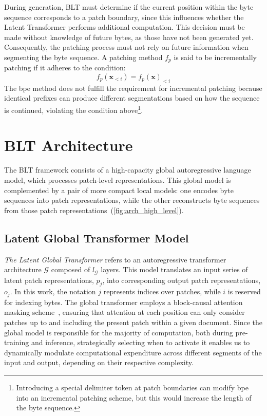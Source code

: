 During generation, {\textsc BLT} must determine if the current position within the byte sequence corresponds to a patch boundary, since this influences whether the Latent Transformer performs additional computation. This decision must be made without knowledge of future bytes, as those have not been generated yet. Consequently, the patching process must not rely on future information when segmenting the byte sequence. A patching method $f_p$ is said to be incrementally patching if it adheres to the condition:
$$f_p(\pmb{x}_{<i}) = f_p(\pmb{x})_{<i}$$
The bpe method does not fulfill the requirement for incremental patching because identical prefixes can produce different segmentations based on how the sequence is continued, violating the condition above\footnote{Introducing a special delimiter token at patch boundaries can modify bpe into an incremental patching scheme, but this would increase the length of the byte sequence.}.

\section{{\textsc BLT} Architecture}
\label{section:architecture}
The {\textsc BLT} framework consists of a high-capacity global autoregressive language model, which processes patch-level representations. This global model is complemented by a pair of more compact local models: one encodes byte sequences into patch representations, while the other reconstructs byte sequences from those patch representations~(\autoref{fig:arch_high_level}).

\subsection{Latent Global Transformer Model}

\textit{The Latent Global Transformer} refers to an autoregressive transformer architecture $\mathcal{G}$ composed of $l_{\mathcal{G}}$ layers. This model translates an input series of latent patch representations, $p_j$, into corresponding output patch representations, $o_j$. In this work, the notation $j$ represents indices over patches, while $i$ is reserved for indexing bytes. The global transformer employs a block-causal attention masking scheme~\citep{dubey2024llama}, ensuring that attention at each position can only consider patches up to and including the present patch within a given document. Since the global model is responsible for the majority of computation, both during pre-training and inference, strategically selecting when to activate it enables us to dynamically modulate computational expenditure across different segments of the input and output, depending on their respective complexity.

